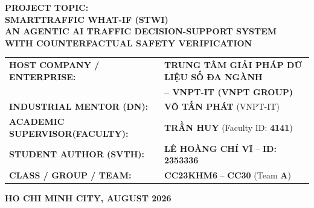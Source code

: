\begin{titlepage}
\begin{center}
    \vspace{0.25cm}
    {\fontsize{11pt}{14pt}\selectfont\textbf{PROJECT TOPIC:}}\\[0.08cm]
    {\fontsize{15pt}{18pt}\selectfont\textbf{\textcolor{blue!80!black}{SMARTTRAFFIC WHAT-IF (STWI)}}}\\[0.08cm]
    {\fontsize{11pt}{14pt}\selectfont\textbf{AN AGENTIC AI TRAFFIC DECISION-SUPPORT SYSTEM\\ WITH COUNTERFACTUAL SAFETY VERIFICATION}}

    \vspace{0.35cm}
    \begin{flushleft}
    \fontsize{10.5pt}{13.5pt}\selectfont
    \hspace{0.2cm}
    \begin{tabular}{p{6.4cm}l}
        \textbf{HOST COMPANY / ENTERPRISE:} & \textbf{TRUNG TÂM GIẢI PHÁP DỮ LIỆU SỐ ĐA NGÀNH} \\
        & \textbf{-- VNPT-IT (VNPT GROUP)} \\[0.08cm]
        \textbf{INDUSTRIAL MENTOR (DN):} & \textbf{VÕ TẤN PHÁT} (VNPT-IT) \\[0.08cm]
        \textbf{ACADEMIC SUPERVISOR}\newline \textbf{(FACULTY):} & \textbf{TRẦN HUY} (Faculty ID: \textbf{4141}) \\[0.08cm]
        \textbf{STUDENT AUTHOR (SVTH):} & \textbf{LÊ HOÀNG CHÍ VĨ} -- \textbf{ID: 2353336} \\[0.08cm]
        \textbf{CLASS / GROUP / TEAM:} & \textbf{CC23KHM6} -- \textbf{CC30} (Team \textbf{A}) \\
    \end{tabular}
    \end{flushleft}

    \vfill

    {\fontsize{11pt}{14pt}\selectfont\textbf{HO CHI MINH CITY, AUGUST 2026}}
    \vspace{0.1cm}

\end{center}

\restoregeometry
\end{titlepage}
